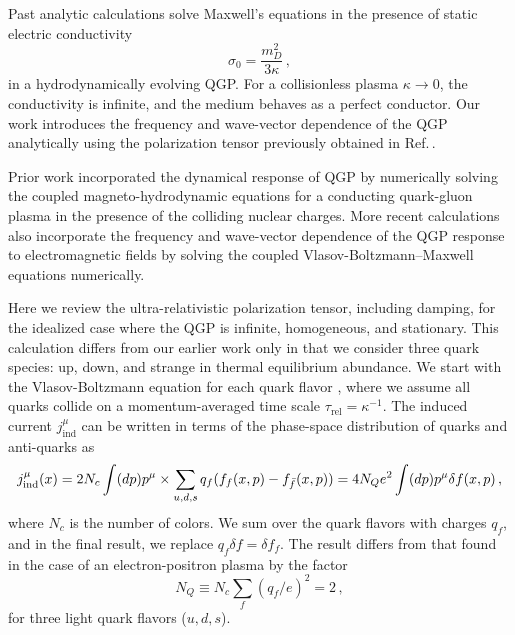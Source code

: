 Past analytic calculations \cite{Tuchin:2010vs,Deng:2012pc,McLerran:2013hla,Tuchin:2013apa,Gursoy:2014aka,Li:2016tel,Roy:2015kma} solve Maxwell's equations in the presence of static electric conductivity 
\begin{equation}
   \sigma_0 = \frac{m_D^2}{3\kappa}\,,
\end{equation} 
in a  hydrodynamically evolving QGP. For a collisionless plasma $\kappa\rightarrow0$, the conductivity is infinite, and the medium behaves as a perfect conductor. Our work introduces the frequency and wave-vector dependence of the QGP analytically using the polarization tensor previously obtained in Ref.\,\cite{Formanek:2021blc}.

Prior work \cite{Inghirami:2016iru,Inghirami:2019mkc} incorporated the dynamical response of QGP by numerically solving the coupled magneto-hydrodynamic equations for a conducting quark-gluon plasma in the presence of the colliding nuclear charges. More recent calculations \cite{Yan:2021zjc,Wang:2021oqq} also incorporate the frequency and wave-vector dependence of the QGP response to electromagnetic fields by solving the coupled Vlasov-Boltzmann--Maxwell equations  numerically.

\label{sec:linresp}
Here we review the ultra-relativistic polarization tensor, including damping, for the idealized case where the QGP is infinite, homogeneous, and stationary. This calculation differs from our earlier work \cite{Formanek:2021blc} only in that we consider three quark species: up, down, and strange in thermal equilibrium abundance. We start with the Vlasov-Boltzmann equation for each quark flavor , where we assume all quarks collide on a momentum-averaged time scale $\tau_{\text{rel}} = \kappa^{-1}$. The induced current $ j_{\mathrm{ind}}^\mu$ can be written in terms of the phase-space distribution of quarks and anti-quarks as
\begin{equation}\label{eq:current}
   j_{\mathrm{ind}}^\mu(x) = 2 N_c \int (dp)p^\mu \\ \times \sum_{u,d,s} q_f (f_{f}(x,p) - f_{\bar{f}}(x,p))=  4 N_Q e^2 \int (dp)p^\mu \delta f(x,p)\,,
\end{equation}
where  $N_c$ is the number of colors. We sum over the quark flavors with charges $q_f$, and in the final result, we replace $q_f \delta f = \delta f_f$. The result  differs from that found in the case of an electron-positron plasma by the factor
\begin{equation}
N_Q \equiv N_c\sum_f (q_f/e)^2 = 2\,,
\end{equation}
for three light quark flavors ($u,d,s$).

